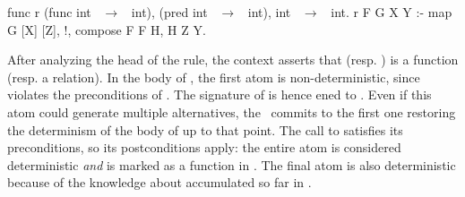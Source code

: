 \begin{elpicode}
func r (func int ~$\to$~ int), (pred int ~$\to$~ int), int ~$\to$~ int.
r F G X Y :- map G [X] [Z], !, compose F F H, H Z Y.
\end{elpicode}
%
After analyzing the head of the rule, the context asserts that  (resp. )
is a function (resp. a relation).
In the body of , the first atom is non-deterministic,
since  violates the preconditions of . The signature of
 is hence \maximize{}ened to \relI. Even if this atom 
could
generate multiple alternatives, the \cut\ commits to the first one
restoring the determinism of
the body of  up to that point.
The call to  satisfies its preconditions, so its
postconditions apply:
the entire atom  is considered deterministic
\emph{and}
 is marked as a function in \ctx.
The final atom  is also deterministic because of the knowledge
about  accumulated so far in \ctx.








